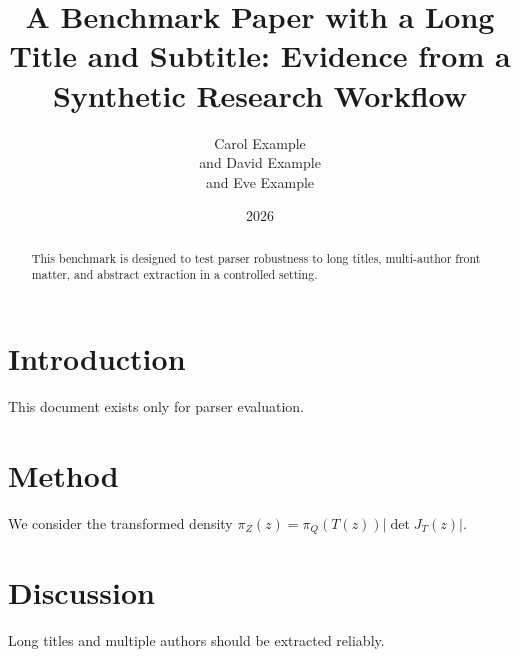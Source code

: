 \documentclass[11pt]{article}
\title{A Benchmark Paper with a Long Title and Subtitle: Evidence from a Synthetic Research Workflow}
\author{Carol Example \\and David Example \\and Eve Example}
\date{2026}
\begin{document}
\maketitle
\begin{abstract}
This benchmark is designed to test parser robustness to long titles, multi-author front matter, and abstract extraction in a controlled setting.
\end{abstract}
\section{Introduction}
This document exists only for parser evaluation.
\section{Method}
We consider the transformed density $\pi_Z(z)=\pi_Q(T(z))|\det J_T(z)|$.
\section{Discussion}
Long titles and multiple authors should be extracted reliably.
\end{document}
